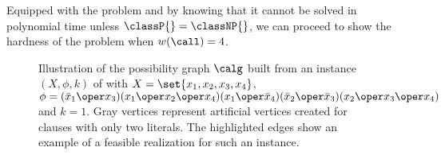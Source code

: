 Equipped with the \kXthreeSAT{} problem and by knowing that it cannot be solved in polynomial time unless $\classP{} = \classNP{}$,
we can proceed to show the hardness of the \GRC{} problem when $w(\call) = 4$.

\begin{figure}[!ht]
    \centering
    
    \caption{
    Illustration of the possibility graph $\calg$ built from an instance $(X, \phi, k)$ of \kXthreeSAT{}{} with
    $X = \set{x_1, x_2, x_3, x_4}$, 
    $\phi = (\bar{x}_1 \oper x_3)(x_1 \oper x_2 \oper x_4)(x_1 \oper \bar{x}_4)(\bar{x}_2 \oper \bar{x}_3)(x_2 \oper x_3 \oper x_4)$
    and $k = 1$.
    Gray vertices represent artificial vertices created for clauses with only two literals.
    The highlighted edges show an example of a feasible realization for such an instance.
    }
    \label{fig:proof_w=4}
    \vspace{-.5cm}
\end{figure}

